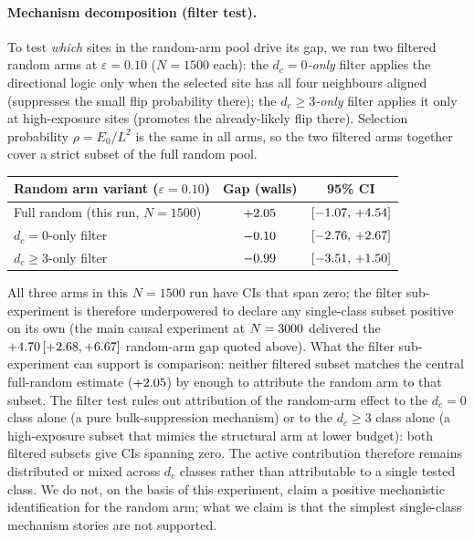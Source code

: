 \documentclass[aps,pre,preprint,superscriptaddress,showpacs]{revtex4-2}
\begin{document}
\paragraph{Mechanism decomposition (filter test).}
\label{sec:filter_decomp}
To test \emph{which} sites in the random-arm pool drive its gap, we
ran two filtered random arms at $\varepsilon=0.10$ ($N=1500$ each):
the \emph{$d_c=0$-only} filter applies the directional logic only when
the selected site has all four neighbours aligned (suppresses the small
flip probability there); the \emph{$d_c\geq 3$-only} filter applies it
only at high-exposure sites (promotes the already-likely flip there).
Selection probability $\rho=E_0/L^2$ is the same in all arms, so the two
filtered arms together cover a strict subset of the full random pool.
\begin{center}
\begin{tabular}{lcc}
\toprule
Random arm variant ($\varepsilon=0.10$) & Gap (walls) & 95\% CI \\
\midrule
Full random (this run, $N=1500$)   & $+2.05$       & $[-1.07,\,+4.54]$ \\
$d_c=0$-only filter                & $-0.10$      & $[-2.76,\,+2.67]$ \\
$d_c\geq 3$-only filter            & $-0.99$   & $[-3.51,\,+1.50]$ \\
\bottomrule
\end{tabular}
\end{center}
All three arms in this $N=1500$ run have CIs that span zero; the
filter sub-experiment is therefore underpowered to declare any
single-class subset positive on its own (the main causal experiment
at $N=3000$ delivered the
$+4.70\,[+2.68,+6.67]$ random-arm gap quoted
above).
What the filter sub-experiment can support is comparison: neither
filtered subset matches the central full-random estimate
($+2.05$) by enough to attribute the random arm to that subset.
The filter test rules out attribution of the random-arm effect to the
$d_c=0$ class alone (a pure bulk-suppression mechanism) or to the
$d_c\geq 3$ class alone (a high-exposure subset that mimics the
structural arm at lower budget): both filtered subsets give CIs
spanning zero.
The active contribution therefore remains distributed or mixed across
$d_c$ classes rather than attributable to a single tested class.
We do not, on the basis of this experiment, claim a positive
mechanistic identification for the random arm; what we claim is that
the simplest single-class mechanism stories are not supported.
\end{document}
